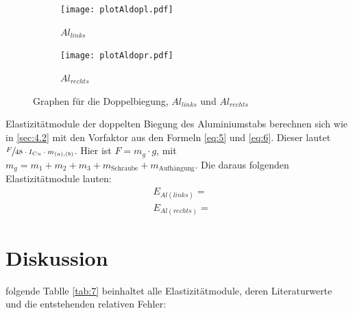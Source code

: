 \begin{figure}[H]
\begin{subfigure}{0.495\linewidth}
    \centering
    \texttt{[image: plotAldopl.pdf]}
    \caption{$Al_{links}$\label{fig:4a}}
\end{subfigure}
\begin{subfigure}{0.495\linewidth}
    \centering
    \texttt{[image: plotAldopr.pdf]}
    \caption{$Al_{rechts}$\label{fig:4b}}    
\end{subfigure}
\caption{Graphen für die Doppelbiegung, $Al_{links}$ und $Al_{rechts}$\label{fig:4}}
\end{figure}

\justifying Elastizitätmodule der doppelten Biegung des Aluminiumstabs berechnen sich wie in \ref{sec:4.2} mit den Vorfaktor
aus den Formeln \eqref{eq:5} und \eqref{eq:6}. Dieser lautet $\sfrac{F}{48 \cdot I_{Cu} \cdot m_{(a),(b)}}$. Hier ist $F = m_g\cdot g$, mit 
$m_g = m_1 + m_2 + m_3 + m_{\text{Schraube}} + m_{\text{Aufhängung}}$. Die daraus folgenden Elastizitätmodule lauten:
\begin{align}
    &E_{Al(links)} = \text{} \label{eq:28}\\
    &E_{Al(rechts)} = \text{} \label{eq:29}
\end{align}



\section{Diskussion}\justifying
{}\justifying folgende Tablle \ref{tab:7} beinhaltet alle Elastizitätmodule, deren Literaturwerte \cite{E_CuAl_Lit} und die entstehenden 
relativen Fehler:


